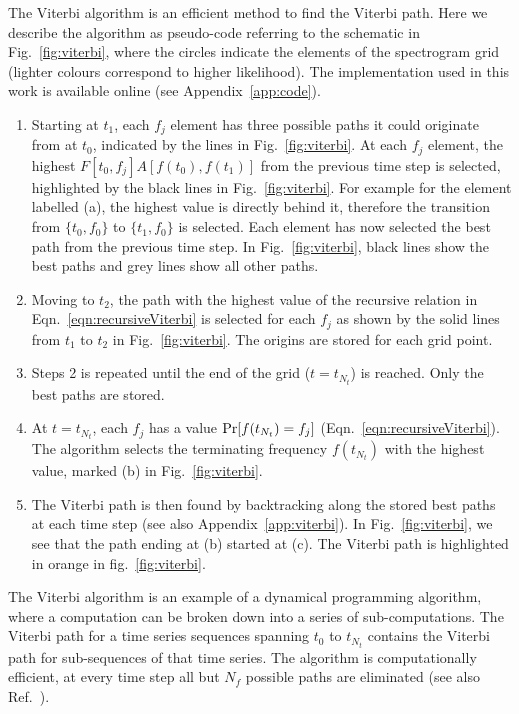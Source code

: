 \documentclass[paper-main.tex]{subfiles}
\begin{document}
The Viterbi algorithm is an efficient method to find the Viterbi path. 
Here we describe the algorithm as pseudo-code referring to the schematic in Fig.~\ref{fig:viterbi}, where the circles indicate the elements of the spectrogram grid (lighter colours correspond to higher likelihood). 
The implementation used in this work is available online (see Appendix~\ref{app:code}).
\begin{enumerate}
\item Starting at $t_1$, each $f_j$ element has three possible paths it could originate from at $t_0$, indicated by the lines in Fig.~\ref{fig:viterbi}. 
At each $f_j$ element, the highest $F[t_0,f_j] A[f(t_0),f(t_1)]$ from the previous time step is selected, highlighted by the black lines in Fig.~\ref{fig:viterbi}. 
For example for the element labelled (a), the highest value is directly behind it, therefore the transition from $\{t_0,f_0\}$ to $\{t_1,f_0\}$ is selected. 
Each element has now selected the best path from the previous time step. 
In Fig.~\ref{fig:viterbi}, black lines show the best paths and grey lines show all other paths. 

\item Moving to $t_2$, the path with the highest value of the recursive relation in Eqn.~\ref{eqn:recursiveViterbi} is selected for each $f_j$ as shown by the solid lines from $t_1$ to $t_2$ in Fig.~\ref{fig:viterbi}. 
The origins are stored for each grid point.

\item Steps 2 is repeated until the end of the grid ($t=t_{N_t}$) is reached. 
Only the best paths are stored. 

\item At $t=t_{N_t}$, each $f_j$ has a value ${\rm Pr}[f(t_{N_t})=f_j]$ (Eqn.~\ref{eqn:recursiveViterbi}). 
The algorithm selects the terminating frequency $f(t_{N_t})$ with the highest value, marked (b) in Fig.~\ref{fig:viterbi}.

\item The Viterbi path is then found by backtracking along the stored best paths at each time step (see also Appendix~\ref{app:viterbi}). 
In Fig.~\ref{fig:viterbi}, we see that the path ending at (b) started at (c). 
The Viterbi path is highlighted in orange in fig.~\ref{fig:viterbi}.
\end{enumerate}
The Viterbi algorithm is an example of a dynamical programming algorithm, where a computation can be broken down into a series of sub-computations.
The Viterbi path for a time series sequences spanning $t_0$ to $t_{N_t}$ contains the Viterbi path for sub-sequences of that time series. 
The algorithm is computationally efficient, at every time step all but $N_f$ possible paths are eliminated (see also Ref.~\cite{ScoX1ViterbiO1:2017}).
\end{document}
